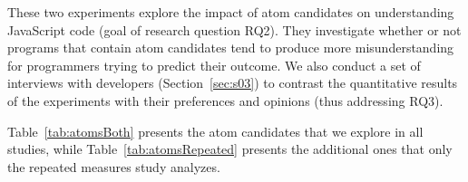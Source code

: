 These two experiments explore the impact of atom candidates on understanding JavaScript code (goal of research question RQ2). They investigate whether or not programs that contain atom candidates tend to produce more misunderstanding for programmers trying to predict their outcome.%
We also conduct a set of interviews with developers (Section~\ref{sec:s03}) to contrast the quantitative results of the experiments with their preferences and opinions (thus addressing RQ3). %

Table~\ref{tab:atomsBoth} presents the atom candidates that we explore in all studies, while Table~\ref{tab:atomsRepeated} presents the additional 
ones that only the repeated measures study analyzes. 


